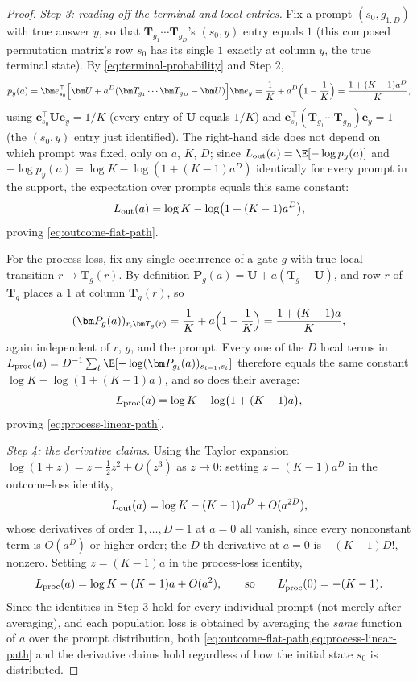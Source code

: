\begin{proof}
\emph{Step 3: reading off the terminal and local entries.} Fix a prompt
$(s_0,g_{1:D})$ with true answer $y$, so that $\bm T_{g_1}\cdots\bm T_{g_D}$'s
$(s_0,y)$ entry equals $1$ (this composed permutation matrix's row $s_0$ has
its single $1$ exactly at column $y$, the true terminal state). By
\cref{eq:terminal-probability} and Step 2,
\[
 p_y(a)=\bm e_{s_0}^\top\Bigl[\bm U+a^D(\bm T_{g_1}\cdots\bm T_{g_D}-\bm U)\Bigr]\bm e_y
 =\frac1K+a^D\Bigl(1-\frac1K\Bigr)=\frac{1+(K-1)a^D}{K},
\]
using $\bm e_{s_0}^\top\bm U\bm e_y=1/K$ (every entry of $\bm U$ equals $1/K$)
and $\bm e_{s_0}^\top(\bm T_{g_1}\cdots\bm T_{g_D})\bm e_y=1$ (the $(s_0,y)$
entry just identified). The right-hand side does not depend on which prompt
was fixed, only on $a$, $K$, $D$; since $L_{\rm out}(a)=\E[-\log p_y(a)]$ and
$-\log p_y(a)=\log K-\log(1+(K-1)a^D)$ identically for every prompt in the
support, the expectation over prompts equals this same constant:
\[
 L_{\rm out}(a)=\log K-\log\bigl(1+(K-1)a^D\bigr),
\]
proving \cref{eq:outcome-flat-path}.

For the process loss, fix any single occurrence of a gate $g$ with true
local transition $r\to\bm T_g(r)$. By definition $\bm P_g(a)=\bm U+a(\bm T_g-\bm U)$,
and row $r$ of $\bm T_g$ places a $1$ at column $\bm T_g(r)$, so
\[
 (\bm P_g(a))_{r,\bm T_g(r)}=\frac1K+a\Bigl(1-\frac1K\Bigr)=\frac{1+(K-1)a}{K},
\]
again independent of $r$, $g$, and the prompt. Every one of the $D$ local
terms in $L_{\rm proc}(a)=D^{-1}\sum_t\E[-\log(\bm P_{g_t}(a))_{s_{t-1},s_t}]$
therefore equals the same constant $\log K-\log(1+(K-1)a)$, and so does
their average:
\[
 L_{\rm proc}(a)=\log K-\log\bigl(1+(K-1)a\bigr),
\]
proving \cref{eq:process-linear-path}.

\emph{Step 4: the derivative claims.} Using the Taylor expansion
$\log(1+z)=z-\tfrac12z^2+O(z^3)$ as $z\to0$: setting $z=(K-1)a^D$ in the
outcome-loss identity,
\[
 L_{\rm out}(a)=\log K-(K-1)a^D+O(a^{2D}),
\]
whose derivatives of order $1,\ldots,D-1$ at $a=0$ all vanish, since every
nonconstant term is $O(a^D)$ or higher order; the $D$-th derivative at $a=0$
is $-(K-1)D!$, nonzero. Setting $z=(K-1)a$ in the process-loss identity,
\[
 L_{\rm proc}(a)=\log K-(K-1)a+O(a^2),\qquad\text{so}\qquad L_{\rm proc}'(0)=-(K-1).
\]
Since the identities in Step 3 hold for every individual prompt (not merely
after averaging), and each population loss is obtained by averaging the
\emph{same} function of $a$ over the prompt distribution, both
\cref{eq:outcome-flat-path,eq:process-linear-path} and the derivative
claims hold regardless of how the initial state $s_0$ is distributed.
\end{proof}

